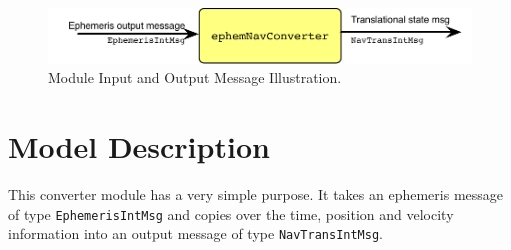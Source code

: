 

\begin{figure}[H]
	\centerline{
		\includegraphics{Figures/moduleImg}
	}
	\caption{Module Input and Output Message Illustration.}
	\label{fig:moduleImg}
\end{figure}

\section{Model Description}
This converter module has a very simple purpose.  It takes an ephemeris message of type {\tt EphemerisIntMsg} and copies over the time, position and velocity information into an output message of type {\tt NavTransIntMsg}. 